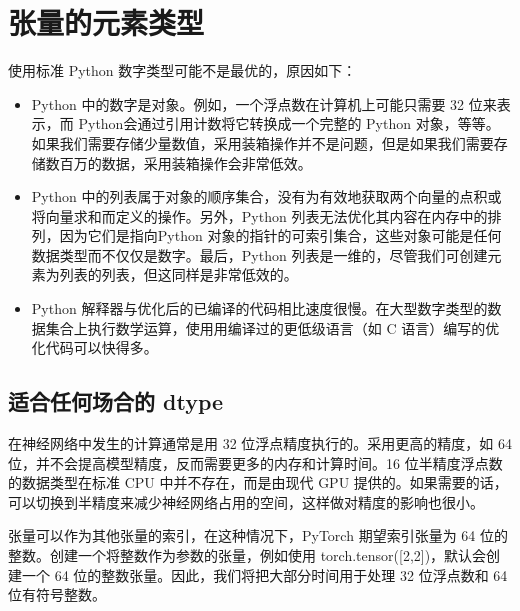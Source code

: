 \section{张量的元素类型}
使用标准 Python 数字类型可能不是最优的，原因如下：
\begin{itemize}
    \item Python 中的数字是对象。例如，一个浮点数在计算机上可能只需要 32 位来表示，而 Python会通过引用计数将它转换成一个完整的 Python 对象，等等。如果我们需要存储少量数值，采用装箱操作并不是问题，但是如果我们需要存储数百万的数据，采用装箱操作会非常低效。
    \item Python 中的列表属于对象的顺序集合，没有为有效地获取两个向量的点积或将向量求和而定义的操作。另外，Python 列表无法优化其内容在内存中的排列，因为它们是指向Python 对象的指针的可索引集合，这些对象可能是任何数据类型而不仅仅是数字。最后，Python 列表是一维的，尽管我们可创建元素为列表的列表，但这同样是非常低效的。
    \item Python 解释器与优化后的已编译的代码相比速度很慢。在大型数字类型的数据集合上执行数学运算，使用用编译过的更低级语言（如 C 语言）编写的优化代码可以快得多。
\end{itemize}
\subsection{适合任何场合的 dtype}
在神经网络中发生的计算通常是用 32 位浮点精度执行的。采用更高的精度，如 64 位，并不会提高模型精度，反而需要更多的内存和计算时间。16 位半精度浮点数的数据类型在标准 CPU 中并不存在，而是由现代 GPU 提供的。如果需要的话，可以切换到半精度来减少神经网络占用的空间，这样做对精度的影响也很小。

张量可以作为其他张量的索引，在这种情况下，PyTorch 期望索引张量为 64 位的整数。创建一个将整数作为参数的张量，例如使用 torch.tensor([2,2])，默认会创建一个 64 位的整数张量。因此，我们将把大部分时间用于处理 32 位浮点数和 64 位有符号整数。